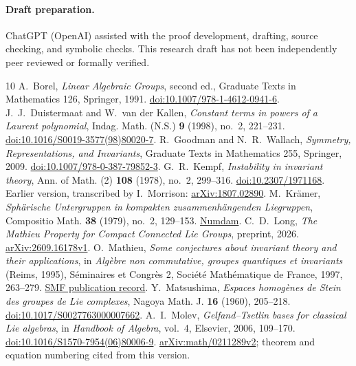 \documentclass[11pt]{article}
\numberwithin{equation}{section}
\theoremstyle{definition}
\theoremstyle{remark}
\begin{document}
\paragraph{Draft preparation.}
ChatGPT (OpenAI) assisted with the proof development, drafting, source checking, and symbolic checks. This research draft has not been independently peer reviewed or formally verified.

\begin{thebibliography}{10}
A.~Borel, \emph{Linear Algebraic Groups}, second ed., Graduate Texts in Mathematics 126, Springer, 1991.
\href{https://doi.org/10.1007/978-1-4612-0941-6}{doi:10.1007/978-1-4612-0941-6}.
J.~J.~Duistermaat and W.~van der Kallen, \emph{Constant terms in powers of a Laurent polynomial}, Indag. Math. (N.S.) \textbf{9} (1998), no.~2, 221--231.
\href{https://doi.org/10.1016/S0019-3577(98)80020-7}{doi:10.1016/S0019-3577(98)80020-7}.
R.~Goodman and N.~R.~Wallach, \emph{Symmetry, Representations, and Invariants}, Graduate Texts in Mathematics 255, Springer, 2009.
\href{https://doi.org/10.1007/978-0-387-79852-3}{doi:10.1007/978-0-387-79852-3}.
G.~R.~Kempf, \emph{Instability in invariant theory}, Ann. of Math. (2) \textbf{108} (1978), no.~2, 299--316.
\href{https://doi.org/10.2307/1971168}{doi:10.2307/1971168}.
Earlier version, transcribed by I.~Morrison:
\href{https://arxiv.org/abs/1807.02890}{arXiv:1807.02890}.
M.~Kr\"amer, \emph{Sph\"arische Untergruppen in kompakten zusammenh\"angenden Liegruppen}, Compositio Math. \textbf{38} (1979), no.~2, 129--153.
\href{https://www.numdam.org/item/CM_1979__38_2_129_0/}{Numdam}.
C.~D.~Long, \emph{The Mathieu Property for Compact Connected Lie Groups}, preprint, 2026.
\href{https://arxiv.org/abs/2609.16178v1}{arXiv:2609.16178v1}.
O.~Mathieu, \emph{Some conjectures about invariant theory and their applications}, in \emph{Alg\`ebre non commutative, groupes quantiques et invariants} (Reims, 1995), S\'eminaires et Congr\`es 2, Soci\'et\'e Math\'ematique de France, 1997, 263--279.
\href{https://smf.emath.fr/publications/some-conjectures-about-invariant-theory-and-their-applications}{SMF publication record}.
Y.~Matsushima, \emph{Espaces homog\`enes de Stein des groupes de Lie complexes}, Nagoya Math. J. \textbf{16} (1960), 205--218.
\href{https://doi.org/10.1017/S0027763000007662}{doi:10.1017/S0027763000007662}.
A.~I.~Molev, \emph{Gelfand--Tsetlin bases for classical Lie algebras}, in \emph{Handbook of Algebra}, vol.~4, Elsevier, 2006, 109--170.
\href{https://doi.org/10.1016/S1570-7954(06)80006-9}{doi:10.1016/S1570-7954(06)80006-9}.
\href{https://arxiv.org/abs/math/0211289v2}{arXiv:math/0211289v2}; theorem and equation numbering cited from this version.
\end{thebibliography}
\end{document}
